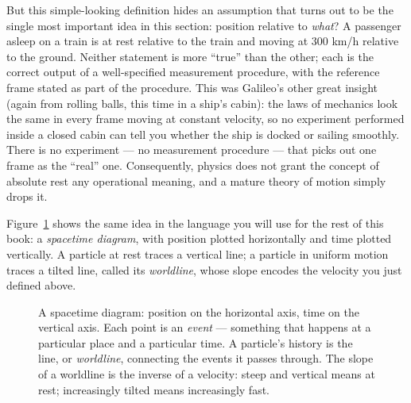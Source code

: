 But this simple-looking definition hides an assumption that turns out to be the
single most important idea in this section: position relative to \emph{what}? A
passenger asleep on a train is at rest relative to the train and moving at
300 \unit{km/h} relative to the ground. Neither statement is more ``true''
than the other; each is the correct output of a well-specified measurement
procedure, with the reference frame stated as part of the procedure. This was
Galileo's other great insight (again from rolling balls, this time in a ship's
cabin): the laws of mechanics look the same in every frame moving at constant
velocity, so no experiment performed inside a closed cabin can tell you whether
the ship is docked or sailing smoothly. There is no experiment --- no
measurement procedure --- that picks out one frame as the ``real'' one.
Consequently, physics does not grant the concept of absolute rest any
operational meaning, and a mature theory of motion simply drops it.

Figure~\ref{fig:worldline} shows the same idea in the language you will use for
the rest of this book: a \emph{spacetime diagram}, with position plotted
horizontally and time plotted vertically. A particle at rest traces a vertical
line; a particle in uniform motion traces a tilted line, called its
\emph{worldline}, whose slope encodes the velocity you just defined above.

\begin{figure}[h]
\centering
{}
\caption{A spacetime diagram: position on the horizontal axis, time on the
    vertical axis. Each point is an \emph{event} --- something that happens at
    a particular place and a particular time. A particle's history is the line,
    or \emph{worldline}, connecting the events it passes through. The slope of
    a worldline is the inverse of a velocity: steep and vertical means at rest;
    increasingly tilted means increasingly fast.}
\label{fig:worldline}
\end{figure}

